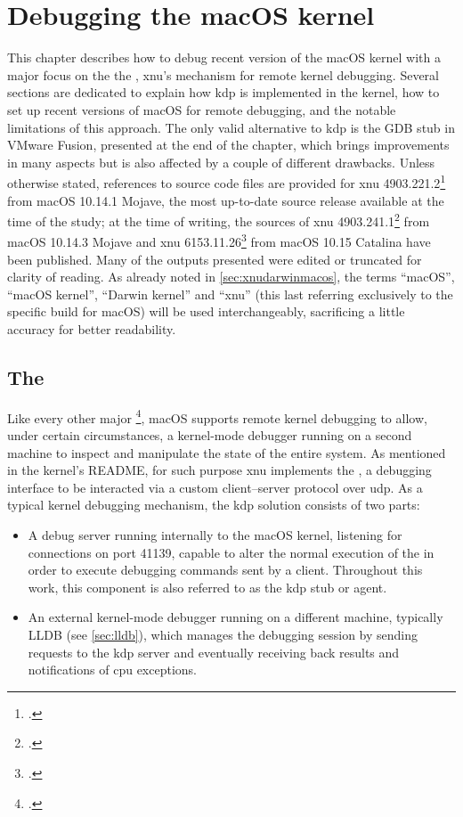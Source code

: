 \chapter{Debugging the macOS kernel}\label{ch:dbgmacos}
This chapter describes how to debug recent version of the macOS kernel with a major focus on the the , \gls{xnu}'s mechanism for remote kernel debugging. Several sections are dedicated to explain how \gls{kdp} is implemented in the kernel, how to set up recent versions of macOS for remote debugging, and the notable limitations of this approach. The only valid alternative to \gls{kdp} is the GDB stub in VMware Fusion, presented at the end of the chapter, which brings improvements in many aspects but is also affected by a couple of different drawbacks. Unless otherwise stated, references to source code files are provided for \gls{xnu} 4903.221.2\footcite{XNU49032212} from macOS 10.14.1 Mojave, the most up-to-date source release available at the time of the study; at the time of writing, the sources of \gls{xnu} 4903.241.1\footcite{XNU49032411} from macOS 10.14.3 Mojave and \gls{xnu} 6153.11.26\footcite{XNU61531126} from macOS 10.15 Catalina have been published. Many of the outputs presented were edited or truncated for clarity of reading. As already noted in \cref{sec:xnudarwinmacos}, the terms \enquote{macOS}, \enquote{macOS kernel}, \enquote{Darwin kernel} and \enquote{\gls{xnu}} (this last referring exclusively to the specific build for macOS) will be used interchangeably, sacrificing a little accuracy for better readability.

\section{The }\label{sec:remotekdbg}
Like every other major \footcites[Windows supports remote kernel debugging with KDNET and the WinDbg debugger, and the Linux kernel with KGDB and the GDB debugger. See][]{WindowsDbg,LinuxDbg}, macOS supports remote kernel debugging to allow, under certain circumstances, a kernel-mode debugger running on a second machine to inspect and manipulate the state of the entire system. As mentioned in the kernel's README, for such purpose \gls{xnu} implements the , a debugging interface to be interacted via a custom client--server protocol over \gls{udp}. As a typical kernel debugging mechanism, the \gls{kdp} solution consists of two parts:
\begin{itemize}
    \item A debug server running internally to the macOS kernel, listening for connections on port 41139, capable to alter the normal execution of the  in order to execute debugging commands sent by a client. Throughout this work, this component is also referred to as the \gls{kdp} stub or agent.
    \item An external kernel-mode debugger running on a different machine, typically LLDB (see \cref{sec:lldb}), which manages the debugging session by sending requests to the \gls{kdp} server and eventually receiving back results and notifications of \gls{cpu} exceptions.
\end{itemize}

